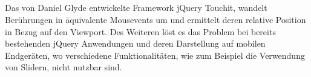 	\subsection{}
	Das von Daniel Glyde entwickelte Framework jQuery Touchit, wandelt Berührungen in äquivalente Mousevents um und ermittelt 	deren relative Position in Bezug auf den Viewport. Des Weiteren löst es das Problem bei bereits bestehenden jQuery Anwendungen und deren Darstellung auf mobilen Endgeräten, wo verschiedene Funktionalitäten, wie zum Beispiel die Verwendung von Slidern, nicht nutzbar sind.
	
	
	
	